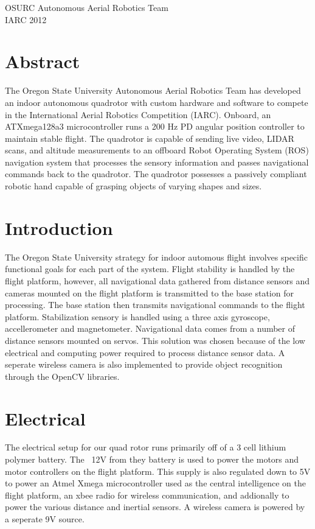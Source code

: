 \documentclass[12pt,letterpaper]{article}
\begin{document}
\begin{titlepage}
    \vspace*{4cm}
    \begin{center}
    {\huge
        OSURC Autonomous Aerial Robotics Team\\[1cm]
    }
    {\large
	IARC 2012\\
    }

    \end{center}
    \vfill
\end{titlepage}


\section{Abstract}

The Oregon State University Autonomous Aerial Robotics Team has developed an
indoor autonomous quadrotor with custom hardware and software to compete in the
International Aerial Robotics Competition (IARC). Onboard, an ATXmega128a3
microcontroller runs a 200 Hz PD angular position controller to maintain stable
flight. The quadrotor is capable of sending live video, LIDAR scans, and
altitude measurements to an offboard Robot Operating System (ROS) navigation
system that processes the sensory information and passes navigational commands
back to the quadrotor. The quadrotor possesses a passively compliant robotic
hand capable of grasping objects of varying shapes and sizes.


\section{Introduction}
	The Oregon State University strategy for indoor automous flight involves
specific functional goals for each part of the system. Flight stability is
handled by the flight platform, however, all navigational data gathered from
distance sensors and cameras mounted on the flight platform is transmitted to
the base station for processing. The base station then transmits navigational
commands to the flight platform.
	Stabilization sensory is handled using a three axis gyroscope, 
accellerometer and magnetometer. Navigational data comes from a number of
distance sensors mounted on servos. This solution was chosen because of the
low electrical and computing power required to process distance sensor data.
A seperate wireless camera is also implemented to provide object recognition
through the OpenCV libraries.

\section{Electrical}
The electrical setup for our quad rotor runs primarily off of a 3 cell
lithium polymer battery. The ~12V from they battery is used to power the motors
and motor controllers on the flight platform. This supply is also regulated down
to 5V to power an Atmel Xmega microcontroller used as the central intelligence
on the flight platform, an xbee radio for wireless communication, and 
addionally to power the various distance and inertial sensors. A wireless camera
is powered by a seperate 9V source.
\end{document}
